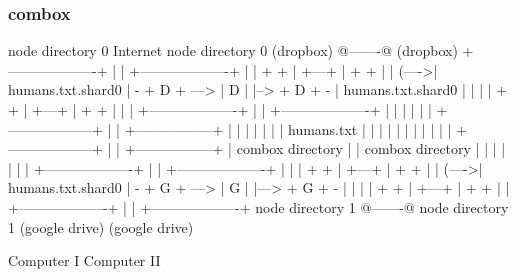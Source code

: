 \begin{frame}[fragile]
  \frametitle{combox}

  {\tiny
  \begin{semiverbatim}

         node directory 0                Internet              node directory 0
         (dropbox)                       @-------@             (dropbox)
        +-------------------+            |       |            +-------------------+
        |                   |    + +     | +---+ |     + +    |                   |
  (---->| humans.txt.shard0 | - + D + ---> | D | |--> + D + - | humans.txt.shard0 |
  |     |                   |    + +     | +---+ |     + +    |                   |
  |     +-------------------+            |       |            +-------------------+
  |                                      |       |
  |                                      |       |
 +------------------+                    |       |                        +-----------------+
 |                  |                    |       |                        |                 |
 |  humans.txt      |                    |       |                        |                 |
 |                  |                    |       |                        |                 |
 +------------------+                    |       |                        +-----------------+
  |  combox directory                    |       |                      combox directory
  |                                      |       |
  |                                      |       |
  |     +-------------------+            |       |             +-------------------+
  |     |                   |    + +     | +---+ |      + +    |                   |
  (---->| humans.txt.shard0 | - + G + ---> | G | |---> + G + - |                   |
        |                   |    + +     | +---+ |      + +    |                   |
        +-------------------+            |       |             +-------------------+
         node directory 1                @-------@              node directory 1
         (google drive)                                         (google drive)

  Computer I                                                                    Computer II
  \end{semiverbatim}
  }

\end{frame}

